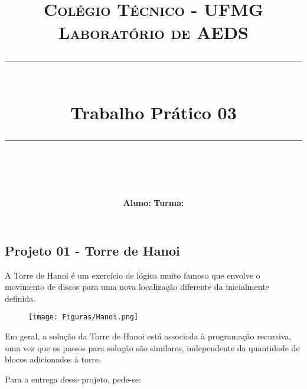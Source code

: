 \documentclass[a4paper]{exam}
\title{
	\normalfont \normalsize 
	\textsc{Colégio Técnico - UFMG \\ 
		Laboratório de AEDS} \\
	\rule{\linewidth}{0.5pt} \\
	\huge Trabalho Prático 03 \\
	\rule{\linewidth}{2pt} \\
}
\author{\textbf{Aluno:} \hspace{10cm} \textbf{Turma:}}
\date{}
\begin{document}
\maketitle

\begin{center}
	\section*{Projeto 01 - Torre de Hanoi}
\end{center}

A Torre de Hanoi é um exercício de lógica muito famoso que envolve o movimento de discos para uma nova localização diferente da inicialmente definida. 

\begin{figure} [H]
	\centering
	\texttt{[image: Figuras/Hanoi.png]}
\end{figure}

Em geral, a solução da Torre de Hanoi está associada à programação recursiva, uma vez que os passos para solução são similares, independente da quantidade de blocos adicionados à torre.

Para a entrega desse projeto, pede-se:
\end{document}

